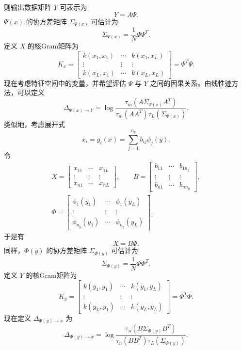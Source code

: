 则输出数据矩阵 $Y$ 可表示为
\begin{equation}
Y=A\Psi.
\tag{7.136}
\end{equation}
$\Psi(x)$ 的协方差矩阵 $\Sigma_{\Psi(x)}$ 可估计为
\begin{equation}
\Sigma_{\Psi(x)}=\frac1N\Psi\Psi^T.
\tag{7.137}
\end{equation}
定义 $X$ 的核Gram矩阵为
\[
K_x=\begin{bmatrix}
k(x_1,x_1)&\cdots&k(x_1,x_L)\\\vdots&\vdots&\vdots\\k(x_L,x_1)&\cdots&k(x_L,x_L)
\end{bmatrix}=\Psi^T\Psi.
\]
现在考虑特征空间中的变量，并希望评估 $\Psi$ 与 $Y$ 之间的因果关系。由线性迹方法，可以定义
\begin{equation}
\Delta_{\Psi(x)\to Y}=\log\frac{\tau_m(A\Sigma_{\Psi(x)}A^T)}{\tau_m(AA^T)\tau_L(\Sigma_{\Psi(x)})}.
\tag{7.138}
\end{equation}
类似地，考虑展开式
\begin{equation}
x_i=g_i(x)=\sum_{j=1}^{n_y}b_{ij}\phi_j(y).
\tag{7.139}
\end{equation}
令
\[
\begin{gathered}
X=\begin{bmatrix}x_{11}&\cdots&x_{1L}\\\vdots&\vdots&\vdots\\x_{n1}&\cdots&x_{nL}\end{bmatrix},\qquad
B=\begin{bmatrix}b_{11}&\cdots&b_{1n_y}\\\vdots&\vdots&\vdots\\b_{n1}&\cdots&b_{nn_y}\end{bmatrix},\\
\Phi=\begin{bmatrix}\phi_1(y_1)&\cdots&\phi_1(y_L)\\\vdots&\vdots&\vdots\\\phi_{n_y}(y_1)&\cdots&\phi_{n_y}(y_L)\end{bmatrix}.
\end{gathered}
\]
于是有
\begin{equation}
X=B\Phi.
\tag{7.140}
\end{equation}
同样，$\Phi(y)$ 的协方差矩阵 $\Sigma_{\Phi(y)}$ 可估计为
\begin{equation}
\Sigma_{\Phi(y)}=\frac1N\Phi\Phi^T.
\tag{7.141}
\end{equation}
定义 $Y$ 的核Gram矩阵为
\[
K_y=\begin{bmatrix}k(y_1,y_1)&\cdots&k(y_1,y_L)\\\vdots&\vdots&\vdots\\k(y_L,y_1)&\cdots&k(y_L,y_L)\end{bmatrix}=\Phi^T\Phi.
\]
现在定义 $\Delta_{\Phi(y)\to x}$ 为
\begin{equation}
\Delta_{\Phi(y)\to x}=\log\frac{\tau_n(B\Sigma_{\Phi(y)}B^T)}{\tau_n(BB^T)\tau_L(\Sigma_{\Phi(y)})}.
\tag{7.142}
\end{equation}

